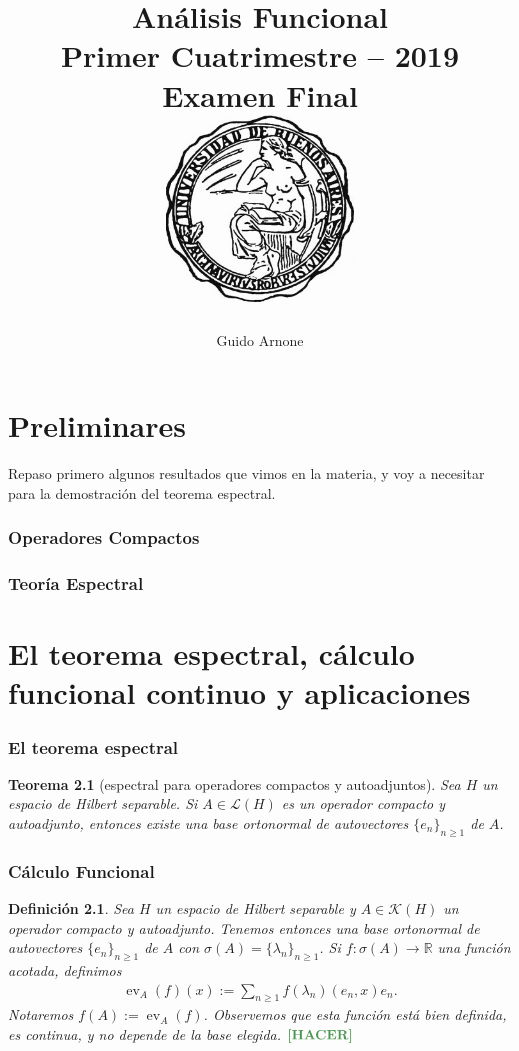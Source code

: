 \documentclass[11pt]{report}
\title{
\LARGE{Análisis Funcional}
\\
\vspace{1pt}
\small{Primer Cuatrimestre -- 2019}
\\
\vspace{0.5pt}
\large{Examen Final}
\\
\vspace{80pt}
{\includegraphics[height=5cm]{uba2.jpg}}
\vspace{80pt}
}
\author{Guido Arnone}
\date{}
\theoremstyle{colored}
\newtheorem{definition}{Definición}[section]
\newtheorem{theorem}{Teorema}[section]
\newcommand{\R}{\mathbb{R}}
\newcommand{\ev}{\operatorname{ev}}
\newcommand{\ip}[1]{( #1 )}
\newcommand{\paint}[1]{\color{color}{#1}}
\newcommand{\tpaint}[1]{\paint{\textbf{#1}}}
\begin{document}
\maketitle
\tableofcontents

\chapter{Preliminares}
Repaso primero algunos resultados que vimos en la materia, y voy a necesitar para la demostración del teorema espectral.
\subsection{Operadores Compactos}
\subsection{Teoría Espectral}
\chapter{El teorema espectral, cálculo funcional continuo y aplicaciones}
\subsection{El teorema espectral}
\begin{theorem}[espectral para operadores compactos y autoadjuntos] Sea $H$ un espacio de Hilbert separable. Si $A \in \mathscr{L}(H)$ es un operador compacto y autoadjunto, entonces existe una base ortonormal de autovectores $\{e_n\}_{n \geq 1}$ de $A$.
\end{theorem}
\subsection{Cálculo Funcional}

\begin{definition} Sea $H$ un espacio de Hilbert separable y $A \in \mathscr{K}(H)$ un operador compacto y autoadjunto. Tenemos entonces una base ortonormal de autovectores $\{e_n\}_{n \geq 1}$ de $A$ con $\sigma(A) = \{\lambda_n\}_{n \geq 1}$. Si $f : \sigma(A) \to \R$ una función acotada, definimos
\begin{align*}
\ev_A(f)(x) := \sum_{n \geq 1}f(\lambda_n)\ip{e_n,x}e_n.
\end{align*}
Notaremos $f(A) := \ev_A(f)$. Observemos que esta función está bien definida, es continua, y no depende de la base elegida. $\tpaint{\textbf{[HACER]}}$
\end{definition}
\end{document}
